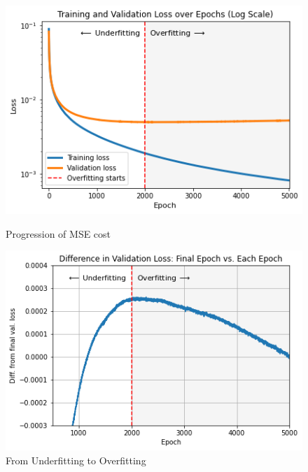 \begin{figure}[h!]
    \centering
    \begin{minipage}[b]{0.45\textwidth}
      \includegraphics[width=\textwidth]{Pictures/SGD_loss_5000_shaded_dashed.png}
      \caption{Progression of MSE cost}\label{fig:SGD_1}
    \end{minipage}
    \hspace{0.3cm}
    \begin{minipage}[b]{0.465\textwidth}
      \includegraphics[width=\textwidth]{Pictures/SGD_loss_5000_differences.png}
      \caption{From Underfitting to Overfitting}\label{fig:SGD_2}
    \end{minipage}
\end{figure}\\
